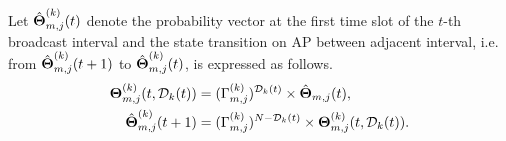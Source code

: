 \begin{definition}
    Let $\hat{\boldsymbol{\Theta}}^{(k)}_{m,j}(t)$ denote the probability vector at the first time slot of the $t$-th broadcast interval and the state transition on AP between adjacent interval, i.e. from $\hat{\boldsymbol{\Theta}}^{(k)}_{m,j}(t+1)$ to $\hat{\boldsymbol{\Theta}}^{(k)}_{m,j}(t)$, is expressed as follows.
    \begin{align}
        \boldsymbol{\Theta}^{(k)}_{m,j}(t, \mathcal{D}_{k}(t)) &= (\Gamma^{(k)}_{m,j})^{\mathcal{D}_{k}(t)} \times \hat{\boldsymbol{\Theta}}_{m,j}(t),
        \nonumber\\
        \hat{\boldsymbol{\Theta}}^{(k)}_{m,j}(t+1) &= (\Gamma^{(k)}_{m,j})^{N-\mathcal{D}_{k}(t)} \times \boldsymbol{\Theta}^{(k)}_{m,j}(t, \mathcal{D}_{k}(t)).
    \end{align}
\end{definition}

